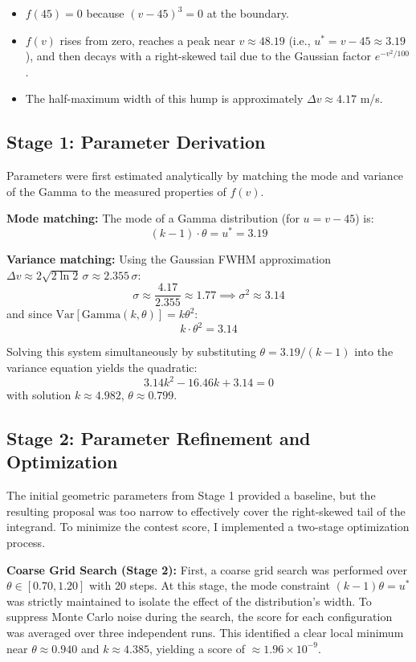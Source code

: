 \documentclass{article}
\begin{document}
\begin{itemize}
    \item $f(45) = 0$ because $(v-45)^3 = 0$ at the boundary.
    \item $f(v)$ rises from zero, reaches a peak near $v \approx 48.19$ (i.e., $u^* = v - 45 \approx 3.19$), and then decays with a right-skewed tail due to the Gaussian factor $e^{-v^2/100}$.
    \item The half-maximum width of this hump is approximately $\Delta v \approx 4.17$ m/s.
\end{itemize}

\subsection*{Stage 1: Parameter Derivation }

Parameters were first estimated analytically by matching the mode and variance of the Gamma to the measured properties of $f(v)$.

\textbf{Mode matching:} The mode of a Gamma distribution (for $u = v - 45$) is:
\[
(k-1)\cdot\theta = u^* = 3.19
\]

\textbf{Variance matching:} Using the Gaussian FWHM approximation $\Delta v \approx 2\sqrt{2\ln 2}\,\sigma \approx 2.355\,\sigma$:
\[
\sigma \approx \frac{4.17}{2.355} \approx 1.77 \implies \sigma^2 \approx 3.14
\]
and since $\text{Var}[\text{Gamma}(k,\theta)] = k\theta^2$:
\[
k\cdot\theta^2 = 3.14
\]

Solving this system simultaneously by substituting $\theta = 3.19/(k-1)$ into the variance equation yields the quadratic:
\[
3.14k^2 - 16.46k + 3.14 = 0
\]
with solution $k \approx 4.982$, $\theta \approx 0.799$.

\subsection*{Stage 2: Parameter Refinement and Optimization}

The initial geometric parameters from Stage 1 provided a baseline, but the resulting proposal was too narrow to effectively cover the right-skewed tail of the integrand. To minimize the contest score, I implemented a two-stage optimization process.

\textbf{Coarse Grid Search (Stage 2):} 
First, a coarse grid search was performed over $\theta \in [0.70, 1.20]$ with 20 steps. At this stage, the mode constraint $(k - 1)\theta = u^*$ was strictly maintained to isolate the effect of the distribution's width. To suppress Monte Carlo noise during the search, the score for each configuration was averaged over three independent runs. This identified a clear local minimum near $\theta \approx 0.940$ and $k \approx 4.385$, yielding a score of $\approx 1.96 \times 10^{-9}$.
\end{document}
